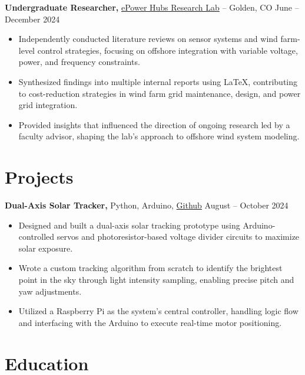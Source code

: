 \documentclass[11pt]{article}       %
\begin{document}
\textbf{Undergraduate Researcher, }{\href{https://www.epowerhubs.com/home}{ePower Hubs Research Lab}} -- Golden, CO \hfill June -- December 2024 \\
\vspace{-6.5pt}
\begin{itemize}
  \item Independently conducted literature reviews on sensor systems and wind farm-level control strategies, focusing on offshore integration with variable voltage, power, and frequency constraints.
  \item Synthesized findings into multiple internal reports using LaTeX, contributing to cost-reduction strategies in wind farm grid maintenance, design, and power grid integration.
  \item Provided insights that influenced the direction of ongoing research led by a faculty advisor, shaping the lab's approach to offshore wind system modeling.
\end{itemize}

\vspace{-18pt}
\section*{Projects}
\vspace{5pt}

\textbf{Dual-Axis Solar Tracker, }{Python, Arduino, \href{https://github.com/edwardasilva/SolarPanelProject}{Github}} \hfill{August -- October 2024} \\
\vspace{-6.5pt}
\begin{itemize}
  \item Designed and built a dual-axis solar tracking prototype using Arduino-controlled servos and photoresistor-based voltage divider circuits to maximize solar exposure.
  \item Wrote a custom tracking algorithm from scratch to identify the brightest point in the sky through light intensity sampling, enabling precise pitch and yaw adjustments.
  \item Utilized a Raspberry Pi as the system's central controller, handling logic flow and interfacing with the Arduino to execute real-time motor positioning.
\end{itemize}


\vspace{-18 pt}
\section*{Education}
\vspace{5pt}
\end{document}
